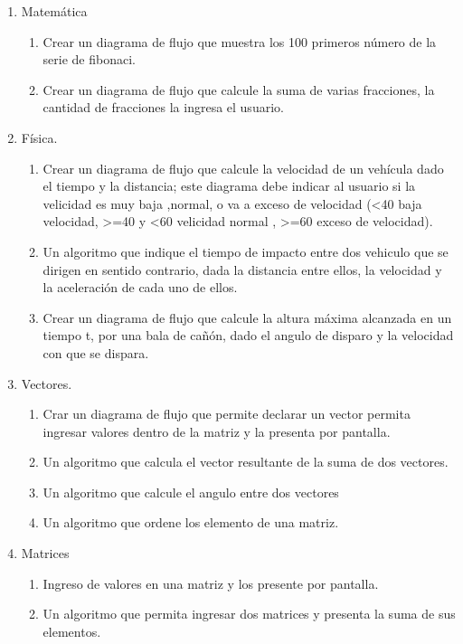 \documentclass[a4paper,12pt,spanish]{article}
\begin{document}
\begin{enumerate}
\item Matemática
  \begin{enumerate}
  \item Crear un diagrama de flujo que muestra los 100 primeros número de la serie de fibonaci.
  \item Crear un diagrama de flujo que calcule la suma de varias fracciones, la cantidad de fracciones la ingresa el usuario.
  \end{enumerate}
\item Física.
  \begin{enumerate}
  \item Crear un diagrama de flujo que calcule la velocidad de un vehícula dado el tiempo y la distancia; este diagrama debe indicar al usuario si la velicidad es muy baja ,normal, o va a exceso de velocidad (<40 baja velocidad, >=40 y <60 velicidad normal , >=60 exceso de velocidad).
  \item Un algoritmo que indique el tiempo de impacto entre dos vehiculo que se dirigen en sentido contrario, dada la distancia entre ellos, la velocidad y la aceleración de cada uno de ellos.
  \item Crear un diagrama de flujo que calcule la altura máxima alcanzada en un tiempo t, por una bala de cañón, dado el angulo de disparo y la velocidad con que se dispara.
  \end{enumerate}
\item Vectores.
  \begin{enumerate}
  \item Crar un diagrama de flujo que permite declarar un vector permita ingresar valores dentro de la matriz y la presenta por pantalla.
  \item  Un algoritmo que calcula el vector resultante de la suma de dos vectores.
  \item Un algoritmo que calcule el angulo entre dos vectores
  \item Un algoritmo que ordene los elemento de una matriz.
  \end{enumerate}

\item Matrices
  \begin{enumerate}
  \item Ingreso de valores en una matriz y los presente por pantalla.
  \item Un algoritmo que permita ingresar dos matrices y presenta la suma de sus elementos.
  \end{enumerate}
 

\end{enumerate}
\end{document}
